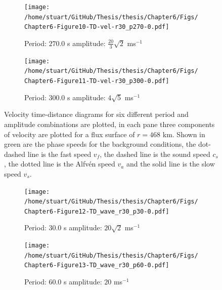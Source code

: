 \documentclass[a4paper,12pt,fourier,authoryear,custommargin]{Classes/PhDThesisPSnPDF}
\begin{document}
\begin{figure}
    \centering
\ContinuedFloat
    

    \begin{subfigure}[b]{0.79\columnwidth}
        \texttt{[image: /home/stuart/GitHub/Thesis/thesis/Chapter6/Figs/Chapter6-Figure10-TD-vel-r30\_p270-0.pdf]}
        \caption{Period: $270.0$ s amplitude: $\frac{20}{3}\sqrt{2}$ ms$^{{-1}}$}
        \label{fig:TD-vel-r30-p270-0}
    \end{subfigure}

    \begin{subfigure}[b]{0.79\columnwidth}
        \texttt{[image: /home/stuart/GitHub/Thesis/thesis/Chapter6/Figs/Chapter6-Figure11-TD-vel-r30\_p300-0.pdf]}
        \caption{Period: $300.0$ s amplitude: $4\sqrt{5}$ ms$^{{-1}}$}
        \label{fig:TD-vel-r30-p300-0}
    \end{subfigure}
    \caption{Velocity time-distance diagrams for six different period and amplitude combinations are plotted, in each pane three components of velocity are plotted for a flux surface of $r=468$ km. Shown in green are the phase speeds for the background conditions, the dot-dashed line is the fast speed $v_f$, the dashed line is the sound speed $c_s$, the dotted line is the Alfv\'en speed $v_a$ and the solid line is the slow speed $v_s$.}
    \label{fig:TD-vel-r30-c}
\end{figure}





\begin{figure}
    \centering
    

    \begin{subfigure}[b]{0.79\columnwidth}
        \texttt{[image: /home/stuart/GitHub/Thesis/thesis/Chapter6/Figs/Chapter6-Figure12-TD\_wave\_r30\_p30-0.pdf]}
        \caption{Period: $30.0$ s amplitude: $20\sqrt{2}$ ms$^{{-1}}$}
        \label{fig:TD-wave-r30-p30-0}
    \end{subfigure}

    \begin{subfigure}[b]{0.79\columnwidth}
        \texttt{[image: /home/stuart/GitHub/Thesis/thesis/Chapter6/Figs/Chapter6-Figure13-TD\_wave\_r30\_p60-0.pdf]}
        \caption{Period: $60.0$ s amplitude: $20$ ms$^{{-1}}$}
        \label{fig:TD-wave-r30-p60-0}
    \end{subfigure}
    \caption{}
    \label{fig:TD-fwave-r30}
\end{figure}
\end{document}
